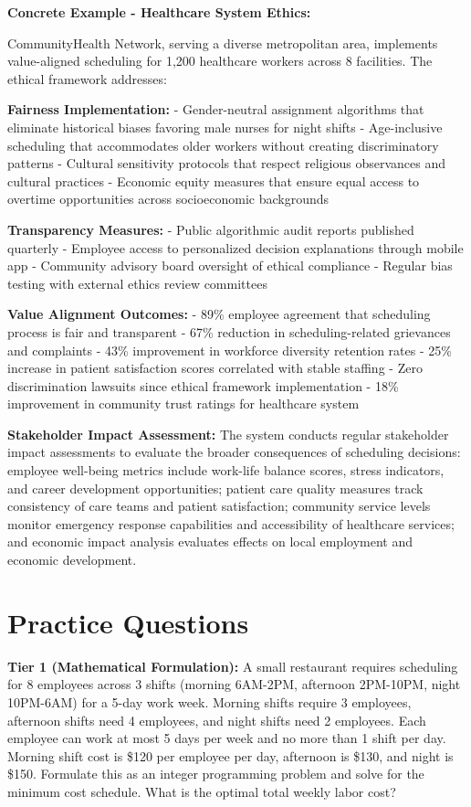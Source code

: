 \documentclass{article}
\begin{document}
\textbf{Concrete Example - Healthcare System Ethics:}

CommunityHealth Network, serving a diverse metropolitan area, implements value-aligned scheduling for 1,200 healthcare workers across 8 facilities. The ethical framework addresses:

\textbf{Fairness Implementation:}
- Gender-neutral assignment algorithms that eliminate historical biases favoring male nurses for night shifts
- Age-inclusive scheduling that accommodates older workers without creating discriminatory patterns
- Cultural sensitivity protocols that respect religious observances and cultural practices
- Economic equity measures that ensure equal access to overtime opportunities across socioeconomic backgrounds

\textbf{Transparency Measures:}
- Public algorithmic audit reports published quarterly
- Employee access to personalized decision explanations through mobile app
- Community advisory board oversight of ethical compliance
- Regular bias testing with external ethics review committees

\textbf{Value Alignment Outcomes:}
- 89\% employee agreement that scheduling process is fair and transparent
- 67\% reduction in scheduling-related grievances and complaints
- 43\% improvement in workforce diversity retention rates
- 25\% increase in patient satisfaction scores correlated with stable staffing
- Zero discrimination lawsuits since ethical framework implementation
- 18\% improvement in community trust ratings for healthcare system

\textbf{Stakeholder Impact Assessment:}
The system conducts regular stakeholder impact assessments to evaluate the broader consequences of scheduling decisions: employee well-being metrics include work-life balance scores, stress indicators, and career development opportunities; patient care quality measures track consistency of care teams and patient satisfaction; community service levels monitor emergency response capabilities and accessibility of healthcare services; and economic impact analysis evaluates effects on local employment and economic development.

\section{Practice Questions}

\textbf{Tier 1 (Mathematical Formulation):} 
A small restaurant requires scheduling for 8 employees across 3 shifts (morning 6AM-2PM, afternoon 2PM-10PM, night 10PM-6AM) for a 5-day work week. Morning shifts require 3 employees, afternoon shifts need 4 employees, and night shifts need 2 employees. Each employee can work at most 5 days per week and no more than 1 shift per day. Morning shift cost is \$120 per employee per day, afternoon is \$130, and night is \$150. Formulate this as an integer programming problem and solve for the minimum cost schedule. What is the optimal total weekly labor cost?
\end{document}
